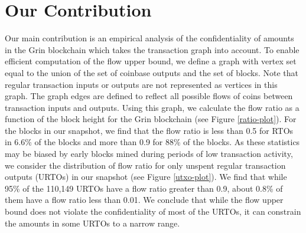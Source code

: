 \section{Our Contribution}
Our main contribution is an empirical analysis of the confidentiality of amounts in the Grin blockchain which takes the transaction graph into account. To enable efficient computation of the flow upper bound, we define a graph with vertex set equal to the union of the set of coinbase outputs and the set of blocks. Note that regular transaction inputs or outputs are not represented as vertices in this graph. The graph edges are defined to reflect all possible flows of coins between transaction inputs and outputs. Using this graph, we calculate the flow ratio as a function of the block height for the Grin blockchain (see Figure \ref{ratio-plot}). For the blocks in our snapshot, we find that the flow ratio is less than 0.5 for RTOs in 6.6\% of the blocks and more than 0.9 for 88\% of the blocks. As these statistics may be biased by early blocks mined during periods of low transaction activity, we consider the distribution of flow ratio for only unspent regular transaction outputs (URTOs) in our snapshot (see Figure \ref{utxo-plot}). We find that while 95\% of the 110,149 URTOs have a flow ratio greater than 0.9, about 0.8\% of them have a flow ratio less than 0.01. We conclude that while the flow upper bound does not violate the confidentiality of most of the URTOs, it can constrain the amounts in some URTOs to a narrow range.



